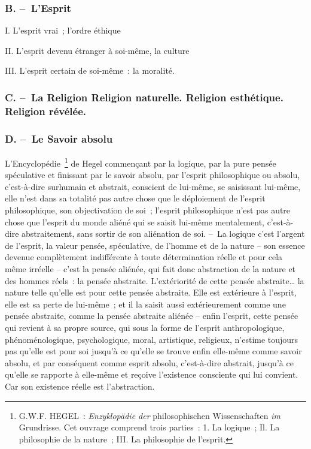 \documentclass[french,twoside]{book} %
\begin{document}
\subsubsection[{B. – L’Esprit}]{B. – L’Esprit}
\noindent I. L’esprit vrai ; l’ordre éthique\par
II. L’esprit devenu étranger à soi-même, la culture\par
III. L’esprit certain de soi-même : la moralité.
\subsubsection[{C. – La Religion Religion naturelle. Religion esthétique. Religion révélée.}]{C. – La Religion Religion naturelle. Religion esthétique. Religion révélée.}
\subsubsection[{D. – Le Savoir absolu}]{D. – Le Savoir absolu}
\noindent L’Encyclopédie \footnote{G.W.F. HEGEL :\emph{ Enzyklopädie der} philosophischen Wissenschaften \emph{im} Grundrisse. Cet ouvrage comprend trois parties : 1. La logique ; Il. La philosophie de la nature ; III. La philosophie de l’esprit.} de Hegel commençant par la logique, par la pure pensée spéculative et finissant par le savoir absolu, par l’esprit philosophique ou absolu, c’est-à-dire surhumain et abstrait, conscient de lui-même, se saisissant lui-même, elle n’est dans sa totalité pas autre chose que le déploiement de l’esprit philosophique, son objectivation de soi ; l’esprit philosophique n’est pas autre chose que l’esprit du monde aliéné qui se saisit lui-même mentalement, c’est-à-dire abstraitement, sans sortir de son aliénation de soi. – La logique c’est l’argent de l’esprit, la valeur pensée, spéculative, de l’homme et de la nature – son essence devenue complètement indifférente à toute détermination réelle et pour cela même irréelle – c’est la pensée aliénée, qui fait donc abstraction de la nature et des hommes réels : la pensée abstraite. L’extériorité de cette pensée abstraite… la nature telle qu’elle est pour cette pensée abstraite. Elle est extérieure à l’esprit, elle est sa perte de lui-même ; et il la saisit aussi extérieurement comme une pensée abstraite, comme la pensée abstraite aliénée – enfin l’esprit, cette pensée qui revient à sa propre source, qui sous la forme de l’esprit anthropologique, phénoménologique, psychologique, moral, artistique, religieux, n’estime toujours pas qu’elle est pour soi jusqu’à ce qu’elle se trouve enfin elle-même comme savoir absolu, et par conséquent comme esprit absolu, c’est-à-dire abstrait, jusqu’à ce qu’elle se rapporte à elle-même et reçoive l’existence consciente qui lui convient. Car son existence réelle est l’abstraction.\par
\end{document}
